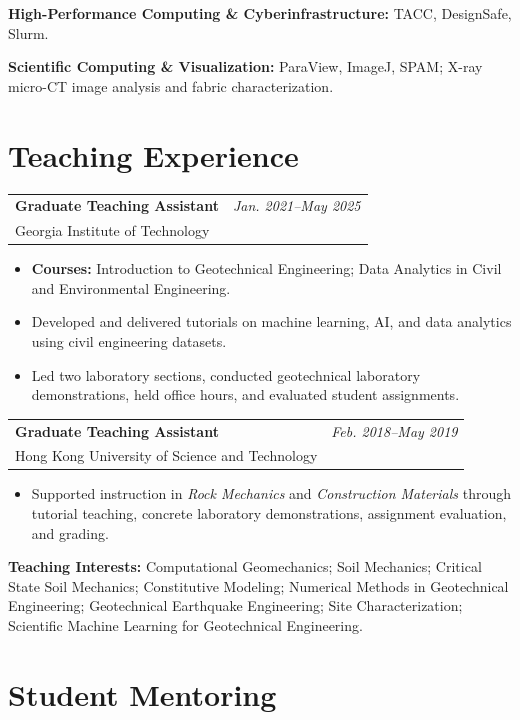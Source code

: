 \documentclass[10pt,letterpaper]{article}
\makeatletter
\newcommand{\entry}[3]{%
  \begin{tabularx}{\textwidth}{@{}X r@{}}
    \textbf{#1} & \textit{#3}\\[-1pt]
    \textcolor{midgray}{#2} &
  \end{tabularx}\vspace{-1pt}
}
\makeatother
\begin{document}
\textbf{High-Performance Computing \& Cyberinfrastructure:}
TACC, DesignSafe, Slurm.
\vspace{2pt}

\textbf{Scientific Computing \& Visualization:}
ParaView, ImageJ, SPAM;
X-ray micro-CT image analysis and fabric characterization.

\section{Teaching Experience}
\entry{Graduate Teaching Assistant}{Georgia Institute of Technology}{Jan. 2021--May 2025}
\begin{itemize}
    \item \textbf{Courses:} Introduction to Geotechnical Engineering; Data Analytics in Civil and Environmental Engineering.
    \item Developed and delivered tutorials on machine learning, AI, and data analytics using civil engineering datasets.
    \item Led two laboratory sections, conducted geotechnical laboratory demonstrations, held office hours, and evaluated student assignments.
\end{itemize}

\vspace{2pt}
\entry{Graduate Teaching Assistant}{Hong Kong University of Science and Technology}{Feb. 2018--May 2019}
\begin{itemize}
    \item Supported instruction in \textit{Rock Mechanics} and \textit{Construction Materials} through tutorial teaching, concrete laboratory demonstrations, assignment evaluation, and grading.
\end{itemize}

\vspace{5pt}
\textbf{Teaching Interests:}
Computational Geomechanics; Soil Mechanics;
Critical State Soil Mechanics; Constitutive Modeling;
Numerical Methods in Geotechnical Engineering;
Geotechnical Earthquake Engineering;
Site Characterization; Scientific Machine Learning
for Geotechnical Engineering.


\section{Student Mentoring}
\end{document}
